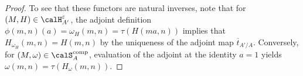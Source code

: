 \begin{proof}
    To see that these functors are natural inverses, note that for $(M,H) \in \calH_{A'}^\varepsilon$, the adjoint definition $\phi(m,n)(a) = \omega_H(m,n) = \tau(H(ma,n))$ implies that $H_{\omega_H}(m,n) = H(m,n)$ by the uniqueness of the adjoint map $\overline{t}_{A'/A}$. Conversely, for $(M,\omega) \in \calS_A^{\text{comp}}$, evaluation of the adjoint at the identity $a = 1$ yields $\omega(m,n) = \tau(H_\omega(m,n))$. 

    
\end{proof}